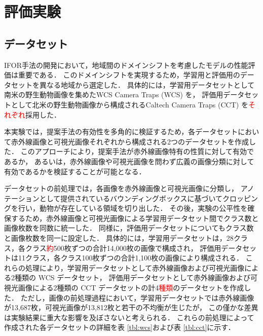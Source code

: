 \documentclass[a4paper,11pt,nomag]{jsreport}
\begin{document}
\setcounter{chapter}{4}

\chapter*{評価実験}

\section{データセット}

IFOR手法の開発において，地域間のドメインシフトを考慮したモデルの性能評価は重要である．
このドメインシフトを実現するため，学習用と評価用のデータセットを異なる地域から選定した．
具体的には，学習用データセットとして南米の野生動物画像を集めたWCS Camera Traps (WCS) \cite{wcs}を，
評価用データセットとして北米の野生動物画像から構成されるCaltech Camera Traps (CCT) \cite{cct}を\textcolor{red}{それぞれ}採用した．

本実験では，提案手法の有効性を多角的に検証するため，各データセットにおいて赤外線画像と可視光画像それぞれから構成される2つのデータセットを作成した．
このアプローチにより，提案手法が赤外線画像特有の性質に対して有効であるか，
あるいは，赤外線画像や可視光画像を問わず広義の画像分類に対して有効であるかを検証することが可能となる．

データセットの前処理では，各画像を赤外線画像と可視光画像に分類し，
アノテーションとして提供されているバウンディングボックスに基づいてクロッピングを行い，動物が存在している領域を切り出した．
その後，実験の公平性を確保するため，赤外線画像と可視光画像による学習用データセット間でクラス数と画像枚数を同数に統一した．
同様に，評価用データセットについてもクラス数と画像枚数を同一に設定した．
具体的には，学習用データセットは，28クラス，各クラス\textcolor{red}{約}500枚ずつの合計14,000枚の画像で構成され，
評価用データセットは11クラス，各クラス100枚ずつの合計1,100枚の画像により構成される．
これらの処理により，学習用データセットとして赤外線画像および可視光画像による2種類の WCS データセット，
評価用データセットとして赤外線画像および可視光画像による2種類の CCT データセットの計4\textcolor{red}{種類}のデータセットを作成した．
ただし，画像の前処理過程において，学習用データセットでは赤外線画像が13,687枚，可視光画像が13,812枚と若干の不均衡が生じたが，
この僅かな差異は実験結果に重大な影響を及ぼさないと考えられる．
これらの前処理によって作成された各データセットの詳細を表 \ref{tbl:wcs}および表 \ref{tbl:cct}に示す．
\end{document}
